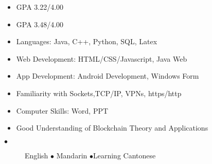 \documentclass[10pt,letterpaper,ragged2e]{altacv}
\begin{document}
\divider

{}
\begin{itemize}
\item GPA  3.22/4.00
\end{itemize}

\smallskip

\begin{itemize}
  \item GPA 3.48/4.00
\end{itemize}
\divider



\begin{itemize}
    \item Languages: Java, C++, Python, SQL, Latex
    \smallskip
    \item Web Development: HTML/CSS/Javascript, Java Web
    \smallskip
    \item App Development: Android Development, Windows Form
    \smallskip
    \item Familiarity with Sockets,TCP/IP, VPNs, https/http
    \smallskip
    \item Computer Skills: Word, PPT
    \smallskip
    \item Good Understanding of Blockchain Theory and Applications
\end{itemize}

\smallskip
\begin{description}
  \item[$\bullet$] English \hspace{0.64cm} {$\bullet$}\hspace{0.1cm} Mandarin \hspace{0.64cm} {$\bullet$}\hspace{0.1cm}Learning Cantonese
\end{description}
\end{document}
